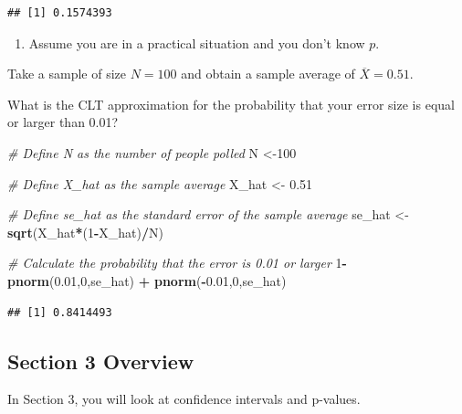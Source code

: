 \documentclass[
]{article}
\newenvironment{Shaded}{\begin{snugshade}}{\end{snugshade}}
\newcommand{\CommentTok}[1]{\textcolor[rgb]{0.56,0.35,0.01}{\textit{#1}}}
\newcommand{\DecValTok}[1]{\textcolor[rgb]{0.00,0.00,0.81}{#1}}
\newcommand{\FloatTok}[1]{\textcolor[rgb]{0.00,0.00,0.81}{#1}}
\newcommand{\KeywordTok}[1]{\textcolor[rgb]{0.13,0.29,0.53}{\textbf{#1}}}
\newcommand{\NormalTok}[1]{#1}
\newcommand{\OperatorTok}[1]{\textcolor[rgb]{0.81,0.36,0.00}{\textbf{#1}}}
\newcommand{\StringTok}[1]{\textcolor[rgb]{0.31,0.60,0.02}{#1}}
\providecommand{\tightlist}{%
  \setlength{\itemsep}{0pt}\setlength{\parskip}{0pt}}
\begin{document}
\begin{verbatim}
## [1] 0.1574393
\end{verbatim}

\begin{enumerate}
\def\labelenumi{\arabic{enumi}.}
\setcounter{enumi}{12}
\tightlist
\item
  Assume you are in a practical situation and you don't know \(p\).
\end{enumerate}

Take a sample of size \(N = 100\) and obtain a sample average of
\(\overline{X} = 0.51\).

What is the CLT approximation for the probability that your error size
is equal or larger than 0.01?

\begin{Shaded}
\begin{Highlighting}[]
\CommentTok{\# Define \textasciigrave{}N\textasciigrave{} as the number of people polled}
\NormalTok{N \textless{}{-}}\DecValTok{100}

\CommentTok{\# Define \textasciigrave{}X\_hat\textasciigrave{} as the sample average}
\NormalTok{X\_hat \textless{}{-}}\StringTok{ }\FloatTok{0.51}

\CommentTok{\# Define \textasciigrave{}se\_hat\textasciigrave{} as the standard error of the sample average}
\NormalTok{se\_hat \textless{}{-}}\StringTok{ }\KeywordTok{sqrt}\NormalTok{(X\_hat}\OperatorTok{*}\NormalTok{(}\DecValTok{1}\OperatorTok{{-}}\NormalTok{X\_hat)}\OperatorTok{/}\NormalTok{N)}

\CommentTok{\# Calculate the probability that the error is 0.01 or larger}
\DecValTok{1}\OperatorTok{{-}}\KeywordTok{pnorm}\NormalTok{(}\FloatTok{0.01}\NormalTok{,}\DecValTok{0}\NormalTok{,se\_hat) }\OperatorTok{+}\StringTok{ }\KeywordTok{pnorm}\NormalTok{(}\OperatorTok{{-}}\FloatTok{0.01}\NormalTok{,}\DecValTok{0}\NormalTok{,se\_hat)}
\end{Highlighting}
\end{Shaded}

\begin{verbatim}
## [1] 0.8414493
\end{verbatim}

\hypertarget{section-3-overview}{%
\subsection{Section 3 Overview}\label{section-3-overview}}

In Section 3, you will look at confidence intervals and p-values.
\end{document}
